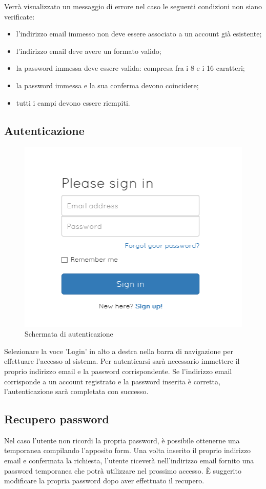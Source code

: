 \documentclass[a4paper, titlepage]{article}
\begin{document}
	Verrà visualizzato un messaggio di errore nel caso le seguenti condizioni non siano verificate:
	\begin{itemize}
		\item l'indirizzo email immesso non deve essere associato a un account già esistente;
		\item l'indirizzo email deve avere un formato valido;
		\item la password immessa deve essere valida: compresa fra i 8 e i 16 caratteri;
		\item la password immessa e la sua conferma devono coincidere;
		\item tutti i campi devono essere riempiti.
	\end{itemize}
	
	\subsection{Autenticazione}
	\begin{figure}[!ht]
		\centering
		\includegraphics[scale=1]{Img/login.png}
		\caption{Schermata di autenticazione}
	\end{figure}
	Selezionare la voce 'Login' in alto a destra nella barra di navigazione per effettuare l'accesso al sistema. Per autenticarsi sarà necessario immettere il proprio indirizzo email e la password corrispondente. Se l'indirizzo email corrisponde a un account registrato e la password inserita è corretta, l'autenticazione sarà completata con successo.

	\subsection{Recupero password}
	Nel caso l'utente non ricordi la propria password, è possibile ottenerne una temporanea compilando l'apposito form. Una volta inserito il proprio indirizzo email e confermata la richiesta, l'utente riceverà nell'indirizzo email fornito una password temporanea che potrà utilizzare nel prossimo accesso. È suggerito modificare la propria password dopo aver effettuato il recupero.
	
\end{document}
